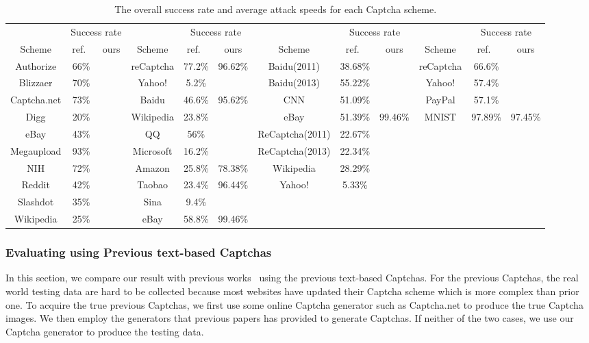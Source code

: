 \begin{table}[t]
    \centering
    \caption{The overall success rate and average attack speeds for each Captcha scheme.}
    \label{table: overall_rate}
    \small
    \begin{tabular}{|c|c|c|c|c|c|c|c|c|c|c|c|}
        \hline
        & \multicolumn{2}{|c|}{Success rate}& & \multicolumn{2}{|c|}{Success rate} & &\multicolumn{2}{|c|}{Success rate} & & \multicolumn{2}{|c|}{Success rate}\\
        \cline{2-3} \cline{5-6} \cline{8-9} \cline{11-12}
        \multirow{-2}{*}{Scheme} & ref.~\cite{Bursztein2011Text} & ours & \multirow{-2}{*}{Scheme} & ref.~\cite{Gao2016A} & ours & \multirow{-2}{*}{Scheme} & ref.~\cite{Bursztein2014The} & ours & \multirow{-2}{*}{Scheme} & ref.~\cite{George2017A} & ours \\
        \hline
        Authorize & 66\% & & reCaptcha & 77.2\% & 96.62\% & Baidu(2011) & 38.68\% & & reCaptcha & 66.6\% & \\
        \hline
        Blizzaer & 70\% & & Yahoo! & 5.2\% & & Baidu(2013) & 55.22\% & & Yahoo! & 57.4\% & \\
        \hline
        Captcha.net & 73\% & & Baidu & 46.6\% & 95.62\% & CNN & 51.09\% & & PayPal & 57.1\% & \\
        \hline
        Digg & 20\% & & Wikipedia & 23.8\% & & eBay & 51.39\% & 99.46\% & MNIST & 97.89\% & 97.45\% \\
        \hline
        eBay & 43\% & & QQ & 56\% & & ReCaptcha(2011) & 22.67\% & & & &\\
        \hline
        Megaupload & 93\% & & Microsoft & 16.2\% & & ReCaptcha(2013) & 22.34\% & & & & \\
        \hline
        NIH & 72\% & & Amazon & 25.8\% & 78.38\% & Wikipedia & 28.29\% & & & & \\
        \hline
        Reddit & 42\% & & Taobao & 23.4\% & 96.44\% & Yahoo! & 5.33\% & & & &  \\
        \hline
        Slashdot & 35\% & & Sina & 9.4\% & & & & & & & \\
        \hline
        Wikipedia & 25\% & & eBay & 58.8\% & 99.46\% & & & & & & \\
        \hline
    \end{tabular}
\end{table}

\subsubsection{Evaluating using Previous text-based Captchas}
In this section, we compare our result with previous works~\cite{Bursztein2011Text,Gao2016A,Bursztein2014The,George2017A} using the previous text-based Captchas.
For the previous Captchas, the real world testing data are hard to be collected because most websites have updated their Captcha scheme which is more complex than prior one. To acquire the true previous Captchas, we first use some online Captcha generator such as Captcha.net to produce the true Captcha images. We then employ the generators that previous papers has provided to generate Captchas. If neither of the two cases, we use our Captcha generator to produce the testing data.

